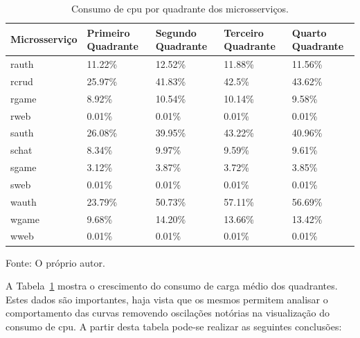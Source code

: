 \begin{table}[htb!]
\centering
\begin{adjustbox}{max width=\textwidth}
\caption{Consumo de \ac{cpu} por quadrante dos microsserviços.}
\label{tab:cpu_microsservicos_media_quadrantes}

\begin{tabular}{|l|l|l|l|l|}
\hline
Microsserviço & Primeiro Quadrante & Segundo Quadrante & Terceiro Quadrante & Quarto Quadrante \\ \hline
rauth         & 11.22\%            & 12.52\%           & 11.88\%            & 11.56\%          \\ \hline
rcrud         & 25.97\%            & 41.83\%           & 42.5\%             & 43.62\%          \\ \hline
rgame         & 8.92\%             & 10.54\%           & 10.14\%            & 9.58\%           \\ \hline
rweb          & 0.01\%             & 0.01\%            & 0.01\%             & 0.01\%           \\ \hline
sauth         & 26.08\%            & 39.95\%           & 43.22\%            & 40.96\%          \\ \hline
schat         & 8.34\%             & 9.97\%            & 9.59\%             & 9.61\%           \\ \hline
sgame         & 3.12\%             & 3.87\%            & 3.72\%             & 3.85\%           \\ \hline
sweb          & 0.01\%             & 0.01\%            & 0.01\%             & 0.01\%           \\ \hline
wauth         & 23.79\%            & 50.73\%           & 57.11\%            & 56.69\%          \\ \hline
wgame         & 9.68\%             & 14.20\%           & 13.66\%            & 13.42\%          \\ \hline
wweb          & 0.01\%             & 0.01\%            & 0.01\%             & 0.01\%           \\ \hline
\end{tabular}
\end{adjustbox}

Fonte: O próprio autor.
\end{table}

A Tabela~\ref{tab:cpu_microsservicos_media_quadrantes} mostra o crescimento do consumo de carga médio dos quadrantes.
%
Estes dados são importantes, haja vista que os mesmos permitem analisar o comportamento das curvas removendo oscilações notórias na visualização do consumo de \ac{cpu}.
%
A partir desta tabela pode-se realizar as seguintes conclusões:

